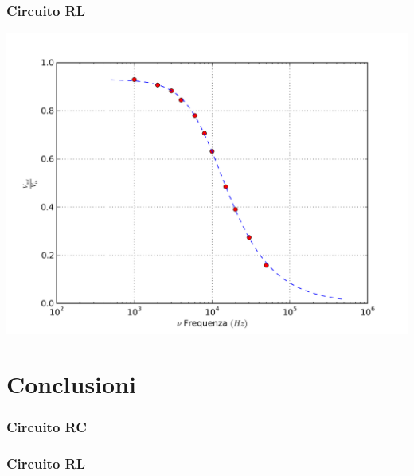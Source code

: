 \subsubsection{Circuito RL}
\begin{center}
 \includegraphics[scale=0.50]{grafici/C3/ddpindu.png}
\end{center}
\section{Conclusioni}
\subsubsection{Circuito RC}
\subsubsection{Circuito RL}
